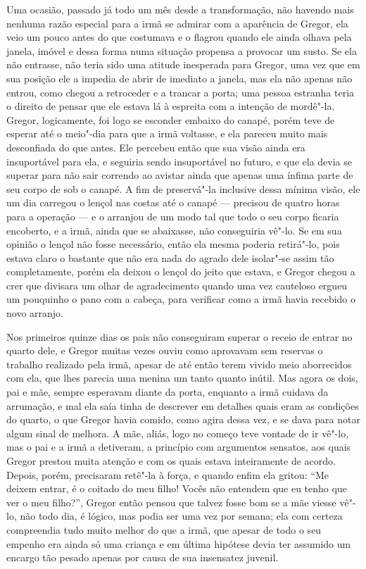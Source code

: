 Uma ocasião, passado já todo um mês desde a transformação, não havendo
mais nenhuma razão especial para a irmã se admirar com a aparência de
Gregor, ela veio um pouco antes do que costumava e o flagrou quando ele
ainda olhava pela janela, imóvel e dessa forma numa situação propensa a
provocar um susto. Se ela não entrasse, não teria sido uma atitude
inesperada para Gregor, uma vez que em sua posição ele a impedia de abrir
de imediato a janela, mas ela não apenas não entrou, como chegou a
retroceder e a trancar a porta; uma pessoa estranha teria o direito de
pensar que ele estava lá à espreita com a intenção de mordê"-la. Gregor,
logicamente, foi logo se esconder embaixo do canapé, porém teve de esperar
até o meio"-dia para que a irmã voltasse, e ela pareceu muito mais
desconfiada do que antes. Ele percebeu então que sua visão ainda era
insuportável para ela, e seguiria sendo insuportável no futuro, e que ela
devia se superar para não sair correndo ao avistar ainda que apenas uma ínfima parte
de seu corpo de sob o canapé. A fim de preservá"-la inclusive
dessa mínima visão, ele um dia carregou o lençol nas costas até o canapé ---
precisou de quatro horas para a operação --- e o arranjou de um modo tal que
todo o seu corpo ficaria encoberto, e a irmã, ainda que se abaixasse, não
conseguiria vê"-lo. Se em sua opinião o lençol não fosse necessário, então
ela mesma poderia retirá"-lo, pois estava claro o bastante que não era nada
do agrado dele isolar"-se assim tão completamente, porém ela deixou o
lençol do jeito que estava, e Gregor chegou a crer que divisara um olhar
de agradecimento quando uma vez cauteloso ergueu um pouquinho o pano com a
cabeça, para verificar como a irmã havia recebido o novo arranjo.

Nos primeiros quinze dias os pais não conseguiram superar o receio de
entrar no quarto dele, e Gregor muitas vezes ouviu como aprovavam sem
reservas o trabalho realizado pela irmã, apesar de até então terem vivido
meio aborrecidos com ela, que lhes parecia uma menina um tanto quanto
inútil. Mas agora os dois, pai e mãe, sempre esperavam diante da porta,
enquanto a irmã cuidava da arrumação, e mal ela saía tinha de descrever em
detalhes quais eram as condições do quarto, o que Gregor havia comido,
como agira dessa vez, e se dava para notar algum sinal de melhora. A mãe,
aliás, logo no começo teve vontade de ir vê"-lo, mas o pai e a irmã a
detiveram, a princípio com argumentos sensatos, aos quais Gregor prestou
muita atenção e com os quais estava inteiramente de acordo. Depois, porém,
precisaram retê"-la à força, e quando enfim ela gritou: “Me deixem entrar,
é o coitado do meu filho! Vocês não entendem que eu tenho que ver o meu
filho?”, Gregor então pensou que talvez fosse bom se a mãe viesse vê"-lo,
não todo dia, é lógico, mas podia ser uma vez por semana; ela com certeza
compreendia tudo muito melhor do que a irmã, que apesar de todo o seu
empenho era ainda só uma criança e em última hipótese devia ter assumido
um encargo tão pesado apenas por causa de sua insensatez juvenil.

